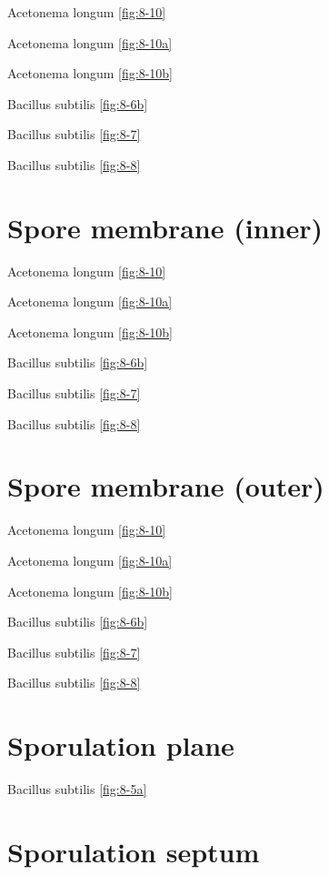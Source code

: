 \documentclass[]{tufte-book}
\begin{document}
Acetonema longum \ref{fig:8-10}

Acetonema longum \ref{fig:8-10a}

Acetonema longum \ref{fig:8-10b}

Bacillus subtilis \ref{fig:8-6b}

Bacillus subtilis \ref{fig:8-7}

Bacillus subtilis \ref{fig:8-8}

\section{\texorpdfstring{\textbf{Spore membrane
(inner)}}{Spore membrane (inner)}}\label{spore-membrane-inner}

Acetonema longum \ref{fig:8-10}

Acetonema longum \ref{fig:8-10a}

Acetonema longum \ref{fig:8-10b}

Bacillus subtilis \ref{fig:8-6b}

Bacillus subtilis \ref{fig:8-7}

Bacillus subtilis \ref{fig:8-8}

\section{\texorpdfstring{\textbf{Spore membrane
(outer)}}{Spore membrane (outer)}}\label{spore-membrane-outer}

Acetonema longum \ref{fig:8-10}

Acetonema longum \ref{fig:8-10a}

Acetonema longum \ref{fig:8-10b}

Bacillus subtilis \ref{fig:8-6b}

Bacillus subtilis \ref{fig:8-7}

Bacillus subtilis \ref{fig:8-8}

\section{\texorpdfstring{\textbf{Sporulation
plane}}{Sporulation plane}}\label{sporulation-plane}

Bacillus subtilis \ref{fig:8-5a}

\section{\texorpdfstring{\textbf{Sporulation
septum}}{Sporulation septum}}\label{sporulation-septum}
\end{document}
